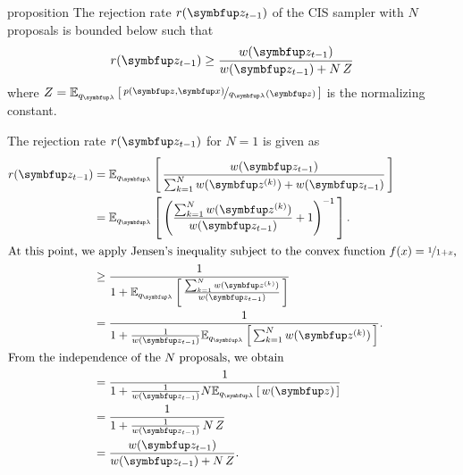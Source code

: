 
\begin{theoremEnd}[]{proposition}\label{thm:cis_bound}
  The rejection rate \(r(\vz_{t-1})\) of the CIS sampler with \(N\) proposals is bounded below such that
  \[
  r(\vz_{t-1}) \geq \frac{w(\vz_{t-1})}{w(\vz_{t-1}) + N\,Z}
  \]
  where \(Z=\Esub{q_{\vlambda}}{\nicefrac{p(\vz,\vx)}{q_{\vlambda}(\vz)}}\) is the normalizing constant.
\end{theoremEnd}
\begin{proofEnd}
  The rejection rate \(r(\vz_{t-1})\) for \(N=1\) is given as
  \begin{align}
    r(\vz_{t-1})
    &= \Esub{q_{\vlambda}}{ \frac{w(\vz_{t-1})}{ \sum^{N}_{k=1} w(\vz^{(k)}) + w(\vz_{t-1})} } \\
    &= \Esub{q_{\vlambda}}{ {\left( \frac{\sum^{N}_{k=1} w(\vz^{(k)}) }{ w(\vz_{t-1}) } + 1 \right)}^{-1} }.  \\
\intertext{At this point, we apply Jensen's inequality subject to the convex function \(f(x) = \nicefrac{1}{1 + x}\),}
    &\geq \frac{1}{1 + \Esub{q_{\vlambda}}{ \frac{\sum^{N}_{k=1} w(\vz^{(k)})}{w(\vz_{t-1})} } } \\
    &=    \frac{1}{1 + \frac{1}{w(\vz_{t-1})} \Esub{q_{\vlambda}}{ \sum^{N}_{k=1} w(\vz^{(k)}) } }. \\
\intertext{From the independence of the \(N\) proposals, we obtain}
    &=    \frac{1}{1 + \frac{1}{w(\vz_{t-1})} N \Esub{q_{\vlambda}}{ w(\vz) } } \\
    &=    \frac{1}{1 + \frac{1}{w(\vz_{t-1})}\,N\,Z } \\
    &=    \frac{w(\vz_{t-1})}{w(\vz_{t-1}) + N\,Z}. \\
  \end{align}
\end{proofEnd}


